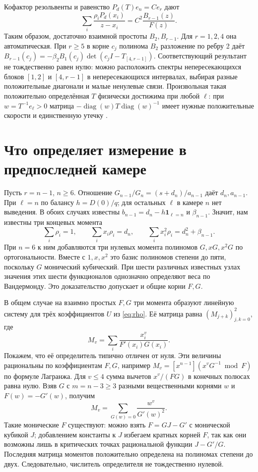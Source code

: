 \documentclass[11pt,a4paper]{article}
\newcommand{\diag}{\operatorname{diag}}
\begin{document}
Кофактор резольвенты и равенство \(P_d(T)e_n=C e_r\) дают
\[
 \sum_i\frac{\rho_iP_d(x_i)}{z-x_i}
   =C^2\frac{B_{r-1}(z)}{F(z)}.
\]
Таким образом, достаточно взаимной простоты \(B_2,B_{r-1}\). Для \(r=1,2,4\) она автоматическая. При \(r\ge5\) в корне \(c_j\) полинома \(B_2\) разложение по ребру 2 даёт \(B_{r-1}(c_j)=-\beta_2B_1(c_j)\det(c_jI-T_{[4,r-1]})\). Соответствующий результант не тождественно равен нулю: можно расположить спектры непересекающихся блоков \([1,2]\) и \([4,r-1]\) в непересекающихся интервалах, выбирая разные положительные диагонали и малые ненулевые связи. Произвольная такая положительно определённая \(T\) физически достижима при любой \(\ell\): при \(w=T^{-1}e_\ell>0\) матрица \(-\diag(w)T\diag(w)^{-1}\) имеет нужные положительные скорости и единственную утечку \cite[§2]{v2}.

\newpage
\section{Что определяет измерение в предпоследней камере}
Пусть \(r=n-1\), \(n\ge6\). Отношение \(G_{n-1}/G_n=(s+d_n)/a_{n-1}\) даёт \(d_n,a_{n-1}\). При \(\ell=n\) по балансу \(h=D(0)/q\); для остальных \(\ell\) в камере \(n\) нет выведения. В обоих случаях известны \(b_{n-1}=d_n-h\mathbf1_{\ell=n}\) и \(\beta_{n-1}\). Значит, нам известны три концевых момента
\[
 \sum_i \rho_i=1,\qquad \sum_i x_i\rho_i=d_n,\qquad
 \sum_i x_i^2\rho_i=d_n^2+\beta_{n-1}.
\]
При \(n=6\) к ним добавляются три нулевых момента полиномов \(G,xG,x^2G\) по ортогональности. Вместе с \(1,x,x^2\) это базис полиномов степени до пяти, поскольку \(G\) монический кубический. При шести различных известных узлах значения этих шести функционалов однозначно определяют веса по Вандермонду. Это доказательство допускает и общие корни \(F,G\).

В общем случае на взаимно простых \(F,G\) три момента образуют линейную систему для трёх коэффициентов \(U\) из \eqref{eq:rho}. Её матрица равна \((M_{j+k})_{j,k=0}^2\), где
\[
 M_v=\sum_i\frac{x_i^v}{F'(x_i)G(x_i)}.
\]
Покажем, что её определитель типично отличен от нуля. Эти величины рациональны по коэффициентам \(F,G\), например \(M_v=[x^{n-1}](x^v G^{-1}\bmod F)\) по формуле Лагранжа. Для \(v\le4\) сумма вычетов \(x^v/(FG)\) в конечных полюсах равна нулю. Взяв \(G\) с \(m=n-3\ge3\) разными вещественными корнями \(w\) и \(F(w)=-G'(w)\), получим
\[
 M_v=\sum_{G(w)=0}\frac{w^v}{G'(w)^2}.
\]
Такие монические \(F\) существуют: можно взять \(F=GJ-G'\) с монической кубикой \(J\); добавлением константы к \(J\) избегаем кратных корней \(F\), так как они возможны лишь в критических точках рациональной функции \(J-G'/G\). Последняя матрица моментов положительно определена на полиномах степени до двух. Следовательно, числитель определителя не тождественно нулевой.
\end{document}
